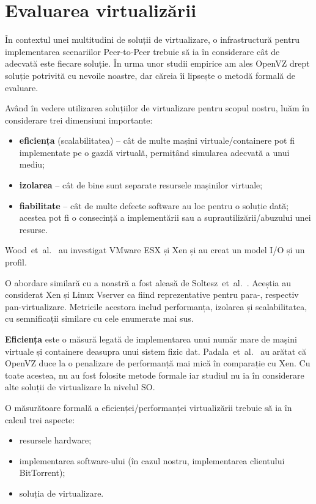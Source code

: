 \section{Evaluarea virtualizării}

În contextul unei multitudini de soluții de virtualizare, o infrastructură
pentru implementarea scenariilor Peer-to-Peer trebuie să ia în considerare
cât de adecvată este fiecare soluție. În urma unor studii empirice am ales
OpenVZ drept soluție potrivită cu nevoile noastre, dar căreia îi lipsește 
o metodă formală de evaluare.

Având în vedere utilizarea soluțiilor de virtualizare pentru scopul nostru,
luăm în considerare trei dimensiuni importante:

\begin{itemize}
  \item \textbf{eficiența} (scalabilitatea) -- cât de multe mașini
  virtuale/containere pot fi implementate pe o gazdă virtuală, permițând
  simularea adecvată a unui mediu;
  \item \textbf{izolarea} -- cât de bine sunt separate resursele mașinilor
  virtuale;
  \item \textbf{fiabilitate} -- cât de multe defecte software au loc pentru
  o soluție dată; acestea pot fi o consecință a implementării sau a
  suprautilizării/abuzului unei resurse.
\end{itemize}

Wood~et~al.~\cite{virt-prof-model} au investigat VMware ESX și Xen și au
creat un model I/O și un profil.

O abordare similară cu a noastră a fost aleasă de 
Soltesz~et~al.~\cite{virt-doppel}. Aceștia au considerat Xen și Linux
Vserver ca fiind reprezentative pentru para-, respectiv pan-virtualizare.
Metricile acestora includ performanța, izolarea și scalabilitatea, cu
semnificații similare cu cele enumerate mai sus.

\textbf{Eficiența} este o măsură legată de implementarea unui număr mare
de mașini virtuale și containere deasupra unui sistem fizic dat.
Padala~et~al.~\cite{eval-virt-performance} au arătat că OpenVZ duce la
o penalizare de performanță mai mică în comparație cu Xen. Cu toate acestea,
nu au fost folosite metode formale iar studiul nu ia în considerare alte
soluții de virtualizare la nivelul SO.

O măsurătoare formală a eficienței/performanței virtualizării trebuie să
ia în calcul trei aspecte:

\begin{itemize}
  \item resursele hardware;
  \item implementarea software-ului (în cazul nostru, implementarea
  clientului BitTorrent);
  \item soluția de virtualizare.
\end{itemize}

